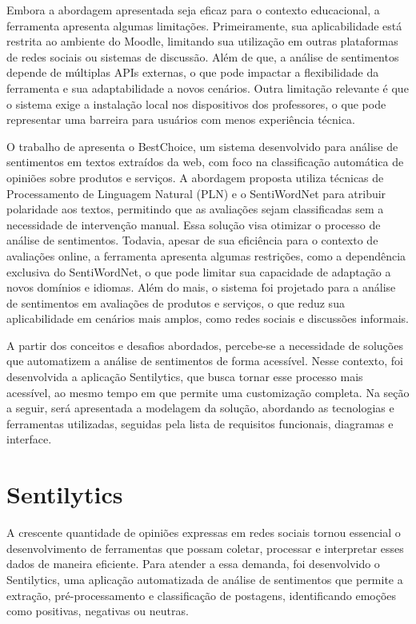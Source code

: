 \documentclass[
	12pt,				%
	oneside,			%
	a4paper,			%
	english,			%
	french,				%
	spanish,			%
	brazil				%
	]{abntex2}
\begin{document}
Embora a abordagem apresentada seja eficaz para o contexto educacional,
a ferramenta apresenta algumas limitações. Primeiramente, sua
aplicabilidade está restrita ao ambiente do Moodle, limitando sua
utilização em outras plataformas de redes sociais ou sistemas de
discussão. Além de que, a análise de sentimentos depende de múltiplas
APIs externas, o que pode impactar a flexibilidade da ferramenta e sua
adaptabilidade a novos cenários. Outra limitação relevante é que o
sistema exige a instalação local nos dispositivos dos professores, o que
pode representar uma barreira para usuários com menos experiência
técnica.

O trabalho de  apresenta o BestChoice, um
sistema desenvolvido para análise de sentimentos em textos extraídos da
web, com foco na classificação automática de opiniões sobre produtos e
serviços. A abordagem proposta utiliza técnicas de Processamento de
Linguagem Natural (PLN) e o SentiWordNet para atribuir polaridade aos
textos, permitindo que as avaliações sejam classificadas sem a
necessidade de intervenção manual. Essa solução visa otimizar o processo
de análise de sentimentos. Todavia, apesar de sua eficiência para o
contexto de avaliações online, a ferramenta apresenta algumas
restrições, como a dependência exclusiva do SentiWordNet, o que pode
limitar sua capacidade de adaptação a novos domínios e idiomas. Além do
mais, o sistema foi projetado para a análise de sentimentos em
avaliações de produtos e serviços, o que reduz sua aplicabilidade em
cenários mais amplos, como redes sociais e discussões informais.

A partir dos conceitos e desafios abordados, percebe-se a necessidade de
soluções que automatizem a análise de sentimentos de forma acessível.
Nesse contexto, foi desenvolvida a aplicação Sentilytics, que busca
tornar esse processo mais acessível, ao mesmo tempo em que permite uma
customização completa. Na seção a seguir, será apresentada a modelagem
da solução, abordando as tecnologias e ferramentas utilizadas, seguidas
pela lista de requisitos funcionais, diagramas e interface.

\hypertarget{sentilytics}{%
\chapter{Sentilytics}\label{sentilytics}}

A crescente quantidade de opiniões expressas em redes sociais tornou
essencial o desenvolvimento de ferramentas que possam coletar, processar
e interpretar esses dados de maneira eficiente. Para atender a essa
demanda, foi desenvolvido o Sentilytics, uma aplicação automatizada de
análise de sentimentos que permite a extração, pré-processamento e
classificação de postagens, identificando emoções como positivas,
negativas ou neutras.
\end{document}

